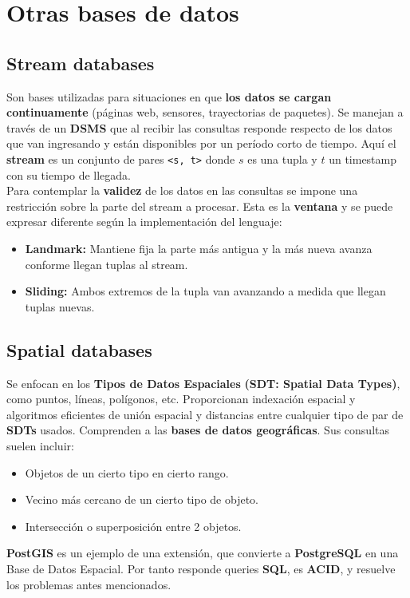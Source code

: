 \section*{Otras bases de datos}
\subsection*{Stream databases}
Son bases utilizadas para situaciones en que \textbf{los datos se cargan continuamente} (páginas web, sensores, trayectorias de paquetes). Se manejan a través de un \textbf{DSMS} que al recibir las consultas responde respecto de los datos que van ingresando y están disponibles por un período corto de tiempo. Aquí el \textbf{stream} es un conjunto de pares \texttt{<s, t>} donde $s$ es una tupla y $t$ un timestamp con su tiempo de llegada. \\
Para contemplar la \textbf{validez} de los datos en las consultas se impone una restricción sobre la parte del stream a procesar. Esta es la \textbf{ventana} y se puede expresar diferente según la implementación del lenguaje:
\begin{itemize}
    \item \textbf{Landmark:} Mantiene fija la parte más antigua y la más nueva avanza conforme llegan tuplas al stream.
    \item \textbf{Sliding:} Ambos extremos de la tupla van avanzando a medida que llegan tuplas nuevas.
\end{itemize}

\subsection*{Spatial databases}
Se enfocan en los \textbf{Tipos de Datos Espaciales} \textbf{(SDT: Spatial Data Types)}, como puntos, líneas, polígonos, etc. Proporcionan indexación espacial y algoritmos eficientes de unión espacial y distancias entre cualquier tipo de par de \textbf{SDTs} usados. Comprenden a las \textbf{bases de datos geográficas}. Sus consultas suelen incluir:
\begin{itemize}
    \item Objetos de un cierto tipo en cierto rango.
    \item Vecino más cercano de un cierto tipo de objeto.
    \item Intersección o superposición entre 2 objetos.
\end{itemize}
\textbf{PostGIS} es un ejemplo de una extensión, que convierte a \textbf{PostgreSQL} en una Base de Datos Espacial. Por tanto responde queries \textbf{SQL}, es \textbf{ACID}, y resuelve los problemas antes mencionados.

